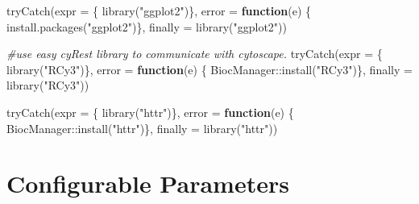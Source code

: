 \documentclass[
]{book}
\newenvironment{Shaded}{\begin{snugshade}}{\end{snugshade}}
\newcommand{\AttributeTok}[1]{\textcolor[rgb]{0.77,0.63,0.00}{#1}}
\newcommand{\CommentTok}[1]{\textcolor[rgb]{0.56,0.35,0.01}{\textit{#1}}}
\newcommand{\ControlFlowTok}[1]{\textcolor[rgb]{0.13,0.29,0.53}{\textbf{#1}}}
\newcommand{\FunctionTok}[1]{\textcolor[rgb]{0.00,0.00,0.00}{#1}}
\newcommand{\NormalTok}[1]{#1}
\newcommand{\SpecialCharTok}[1]{\textcolor[rgb]{0.00,0.00,0.00}{#1}}
\newcommand{\StringTok}[1]{\textcolor[rgb]{0.31,0.60,0.02}{#1}}
\begin{document}
\begin{Shaded}
\begin{Highlighting}[]
\FunctionTok{tryCatch}\NormalTok{(}\AttributeTok{expr =}\NormalTok{ \{ }\FunctionTok{library}\NormalTok{(}\StringTok{"ggplot2"}\NormalTok{)\}, }
         \AttributeTok{error =} \ControlFlowTok{function}\NormalTok{(e) \{ }\FunctionTok{install.packages}\NormalTok{(}\StringTok{"ggplot2"}\NormalTok{)\}, }
         \AttributeTok{finally =} \FunctionTok{library}\NormalTok{(}\StringTok{"ggplot2"}\NormalTok{))}

\CommentTok{\#use easy cyRest library to communicate with cytoscape.}
\FunctionTok{tryCatch}\NormalTok{(}\AttributeTok{expr =}\NormalTok{ \{ }\FunctionTok{library}\NormalTok{(}\StringTok{"RCy3"}\NormalTok{)\}, }
         \AttributeTok{error =} \ControlFlowTok{function}\NormalTok{(e) \{ BiocManager}\SpecialCharTok{::}\FunctionTok{install}\NormalTok{(}\StringTok{"RCy3"}\NormalTok{)\}, }
         \AttributeTok{finally =} \FunctionTok{library}\NormalTok{(}\StringTok{"RCy3"}\NormalTok{))}

\FunctionTok{tryCatch}\NormalTok{(}\AttributeTok{expr =}\NormalTok{ \{ }\FunctionTok{library}\NormalTok{(}\StringTok{"httr"}\NormalTok{)\}, }
         \AttributeTok{error =} \ControlFlowTok{function}\NormalTok{(e) \{ BiocManager}\SpecialCharTok{::}\FunctionTok{install}\NormalTok{(}\StringTok{"httr"}\NormalTok{)\}, }
         \AttributeTok{finally =} \FunctionTok{library}\NormalTok{(}\StringTok{"httr"}\NormalTok{))}
\end{Highlighting}
\end{Shaded}

\hypertarget{configurable-parameters-2}{%
\section{Configurable Parameters}\label{configurable-parameters-2}}
\end{document}
